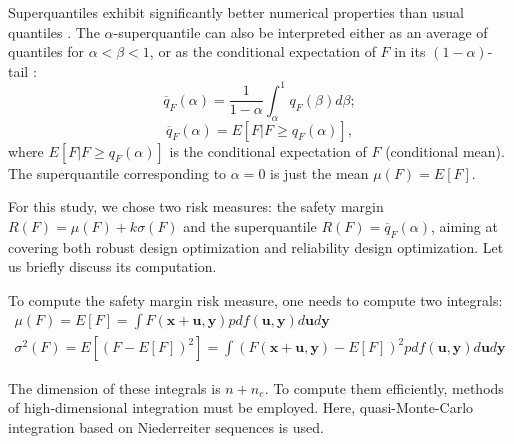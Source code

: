 \documentclass{llncs}
\begin{document}
Superquantiles exhibit significantly better numerical properties than usual quantiles \cite{RockafellarRoyset2010}. The $\alpha$-superquantile can also be interpreted either as an average of quantiles  for $\alpha < \beta <1$, or as the conditional expectation of $F$ in its $(1-\alpha)$-tail \cite{RockafellarRoyset2015}:
\[
\overline{q}_F(\alpha) = \frac{1}{1-\alpha} \int_\alpha^1q_F(\beta)d\beta ;
\]
\[
\overline{q}_F(\alpha) = E\left[F|F\geq q_F(\alpha)\right],
\]
where $E\left[F|F\geq q_F(\alpha)\right]$ is the conditional expectation of $F$ (conditional mean). The superquantile corresponding to $\alpha = 0$ is just the mean $\mu(F)=E[F]$.

For this study, we chose two risk measures: the safety margin $R(F)=\mu(F)+k\sigma(F)$ and the superquantile $R(F)=\overline{q}_F(\alpha)$, aiming at covering both robust design optimization and reliability design optimization. Let us briefly discuss its computation.

To compute the safety margin risk measure, one needs to compute two integrals:
\begin{gather*}
    \mu (F)=E[F]=\int F(\boldsymbol x + \boldsymbol u, \boldsymbol y)p df(\boldsymbol u, \boldsymbol y)d\boldsymbol u d\boldsymbol y \\
    \sigma^2(F)=E[(F-E[F])^2]=\int(F(\boldsymbol x + \boldsymbol u, \boldsymbol y)-E[F])^2 p df(\boldsymbol u, \boldsymbol y)d\boldsymbol u d\boldsymbol y
\end{gather*}

The dimension of these integrals is $n+n_e$. To compute them efficiently, methods of high-dimensional integration must be employed. Here, quasi-Monte-Carlo integration \cite{Caflisch1998} based on Niederreiter sequences \cite{Niederreiter1992} is used.
\end{document}
